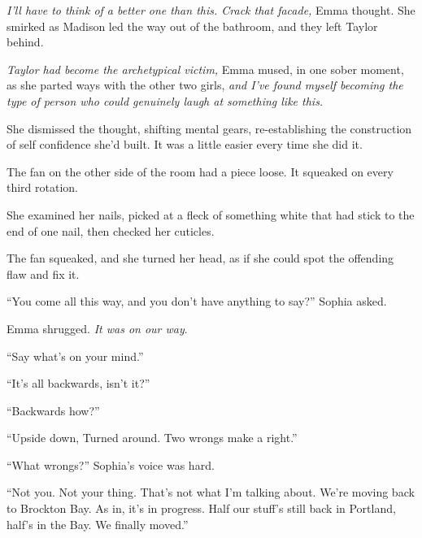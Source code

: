 \emph{I'll have to think of a better one than this.  Crack that facade, }Emma thought.  She smirked as Madison led the way out of the bathroom, and they left Taylor behind.



\emph{Taylor had become the archetypical victim,} Emma mused, in one sober moment, as she parted ways with the other two girls, \emph{and I've found myself becoming the type of person who could genuinely laugh at something like this.}



She dismissed the thought, shifting mental gears, re-establishing the construction of self confidence she'd built.\emph{  }It was a little easier every time she did it.



\sectionbreak



The fan on the other side of the room had a piece loose.  It squeaked on every third rotation.



She examined her nails, picked at a fleck of something white that had stick to the end of one nail, then checked her cuticles.



The fan squeaked, and she turned her head, as if she could spot the offending flaw and fix it.



``You come all this way, and you don't have anything to say?''  Sophia asked.



Emma shrugged.  \emph{It was on our way}.



``Say what's on your mind.''



``It's all backwards, isn't it?''



``Backwards how?''



``Upside down, Turned around.  Two wrongs make a right.''



``What wrongs?''  Sophia's voice was hard.



``Not you.  Not your thing.  That's not what I'm talking about.  We're moving back to Brockton Bay.  As in, it's in progress.  Half our stuff's still back in Portland, half's in the Bay.  We finally moved.''




